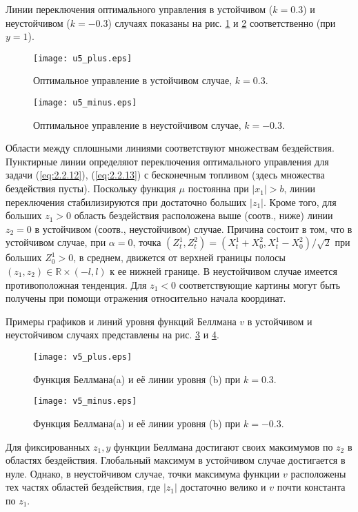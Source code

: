 Линии переключения оптимального управления в устойчивом ($k=0.3$)  и неустойчивом ($k=-0.3$) случаях показаны на рис.
\ref{fig:2.4} и \ref{fig:2.5} соответственно (при $y=1$).
\begin{figure}[h]
        \centering
       \texttt{[image: u5\_plus.eps]}
         \caption{Оптимальное управление в устойчивом случае, $k=0.3$.}
         \label{fig:2.4}
\end{figure}
\begin{figure}[h]
        \centering
       \texttt{[image: u5\_minus.eps]}
         \caption{Оптимальное управление в неустойчивом случае, $k=-0.3$.}
         \label{fig:2.5}
\end{figure}

Области между сплошными линиями соответствуют множествам бездействия. Пунктирные линии определяют переключения оптимального управления для задачи (\ref{eq:2.2.12}), (\ref{eq:2.2.13}) с бесконечным топливом (здесь множества бездействия пусты).
Поскольку функция $\mu$ постоянна при $|x_1|>b$, линии переключения стабилизируются при достаточно больших  $|z_1|$. Кроме того, для больших $z_1>0$ область бездействия расположена выше (соотв., ниже) линии $z_2=0$ в устойчивом (соотв., неустойчивом) случае. Причина состоит в том, что в устойчивом случае, при $\alpha=0$, точка $(Z^1_t,Z^2_t)=(X_t^1+X_0^2,X_t^1-X_0^2)/\sqrt 2$ при больших $Z^1_0>0$, в среднем, движется от верхней границы полосы $(z_1,z_2)\in\mathbb R\times (-l,l)$ к ее нижней границе. В неустойчивом случае имеется противоположная тенденция. Для $z_1<0$ соответствующие картины могут быть получены при помощи отражения относительно начала координат.

Примеры графиков и линий уровня функций Беллмана $v$ в устойчивом и неустойчивом случаях представлены на рис. \ref{fig:2.6} и \ref{fig:2.7}.

\begin{figure}[h]
        \centering
       \texttt{[image: v5\_plus.eps]}
         \caption{Функция Беллмана(a) и её линии уровня (b) при $k=0.3$.}
         \label{fig:2.6}
\end{figure}
\begin{figure}[h]
        \centering
       \texttt{[image: v5\_minus.eps]}
         \caption{Функция Беллмана(a) и её линии уровня (b) при $k=-0.3$.}
         \label{fig:2.7}
\end{figure}

Для фиксированных $z_1, y$ функции Беллмана достигают своих максимумов по $z_2$ в областях бездействия. Глобальный максимум в устойчивом случае достигается в нуле. Однако, в неустойчивом случае, точки максимума функции $v$ расположены тех частях областей бездействия, где $|z_1|$ достаточно велико и $v$ почти константа по $z_1$.

\clearpage
